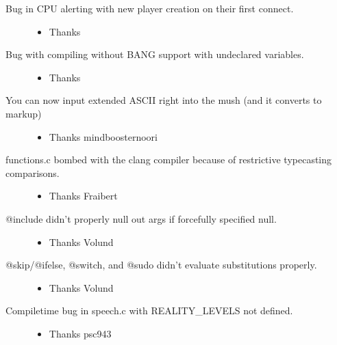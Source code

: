 \documentclass[letterpaper,10pt,english]{sphinxmanual}
\begin{document}
\begin{description}
\item[{Bug in CPU alerting with new player creation on their first connect.}] \leavevmode\begin{itemize}
\item {} 
\sphinxAtStartPar
Thanks 

\end{itemize}

\item[{Bug with compiling without BANG support with undeclared variables.}] \leavevmode\begin{itemize}
\item {} 
\sphinxAtStartPar
Thanks 

\end{itemize}

\item[{You can now input extended ASCII right into the mush (and it converts to markup)}] \leavevmode\begin{itemize}
\item {} 
\sphinxAtStartPar
Thanks mindboosternoori

\end{itemize}

\item[{functions.c bombed with the clang compiler because of restrictive type\sphinxhyphen{}casting comparisons.}] \leavevmode\begin{itemize}
\item {} 
\sphinxAtStartPar
Thanks Fraibert

\end{itemize}

\item[{@include didn’t properly null out args if forcefully specified null.}] \leavevmode\begin{itemize}
\item {} 
\sphinxAtStartPar
Thanks Volund

\end{itemize}

\item[{@skip/@ifelse, @switch, and @sudo didn’t evaluate substitutions properly.}] \leavevmode\begin{itemize}
\item {} 
\sphinxAtStartPar
Thanks Volund

\end{itemize}

\item[{Compiletime bug in speech.c with REALITY\_LEVELS not defined.}] \leavevmode\begin{itemize}
\item {} 
\sphinxAtStartPar
Thanks psc943

\end{itemize}

\end{description}
\end{document}
